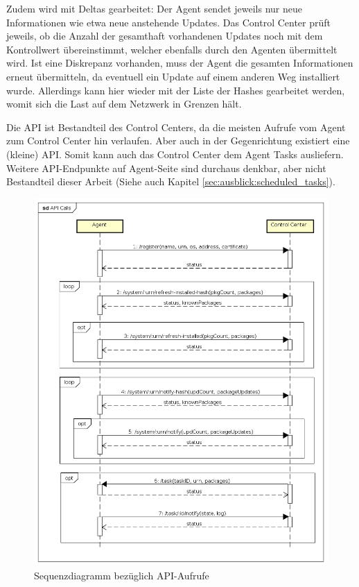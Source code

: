 Zudem wird mit Deltas gearbeitet: Der Agent sendet jeweils nur neue Informationen wie etwa neue anstehende Updates. Das Control Center prüft jeweils, ob die Anzahl der gesamthaft vorhandenen Updates noch mit dem Kontrollwert übereinstimmt, welcher ebenfalls durch den Agenten übermittelt wird. Ist eine Diskrepanz vorhanden, muss der Agent die gesamten Informationen erneut übermitteln, da eventuell ein Update auf einem anderen Weg installiert wurde. Allerdings kann hier wieder mit der Liste der Hashes gearbeitet werden, womit sich die Last auf dem Netzwerk in Grenzen hält.

Die API ist Bestandteil des Control Centers, da die meisten Aufrufe vom Agent zum Control Center hin verlaufen. Aber auch in der Gegenrichtung existiert eine (kleine) API. Somit kann auch das Control Center dem Agent Tasks ausliefern. Weitere API-Endpunkte auf Agent-Seite sind durchaus denkbar, aber nicht Bestandteil dieser Arbeit (Siehe auch Kapitel \ref{sec:ausblick:scheduled_tasks}).

\clearpage

\begin{figure}
  \centering
    \includegraphics[width=\textwidth]{files/API_Calls}
  \caption{Sequenzdiagramm bezüglich API-Aufrufe}
  \label{fig:api_sequence_diagram}
\end{figure}

